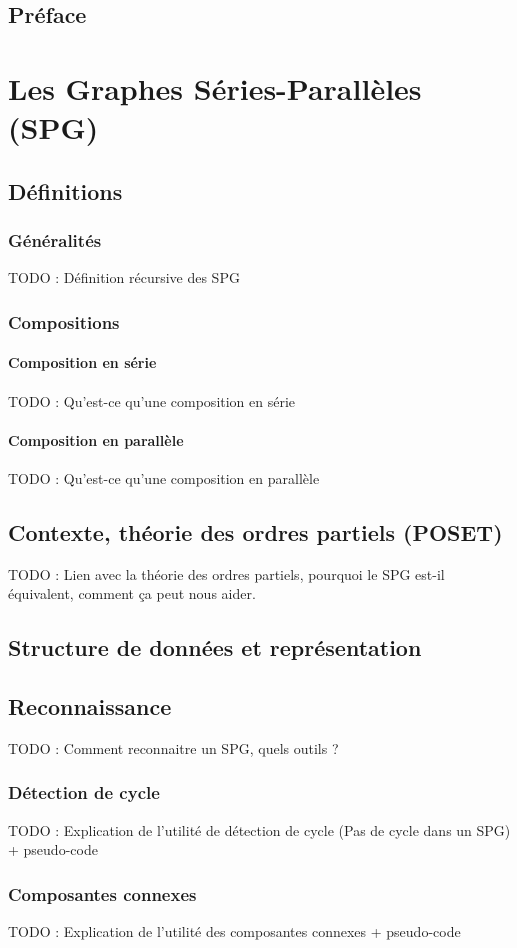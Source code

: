 \documentclass[11pt]{report}
\begin{document}
\section{Préface}

\chapter{Les Graphes Séries-Parallèles (SPG)}
\section{Définitions}
\subsection{Généralités}
TODO : Définition récursive des SPG
\subsection{Compositions}
\subsubsection{Composition en série}
TODO : Qu'est-ce qu'une composition en série
\subsubsection{Composition en parallèle}
TODO : Qu'est-ce qu'une composition en parallèle
\section{Contexte, théorie des ordres partiels (POSET)}
TODO : Lien avec la théorie des ordres partiels, pourquoi le SPG est-il équivalent, comment ça peut nous aider.
\section{Structure de données et représentation}
\section{Reconnaissance}
TODO : Comment reconnaitre un SPG, quels outils ?
\subsection{Détection de cycle}
TODO : Explication de l'utilité de détection de cycle (Pas de cycle dans un SPG) + pseudo-code 
\subsection{Composantes connexes}
TODO : Explication de l'utilité des composantes connexes + pseudo-code 
\end{document}
